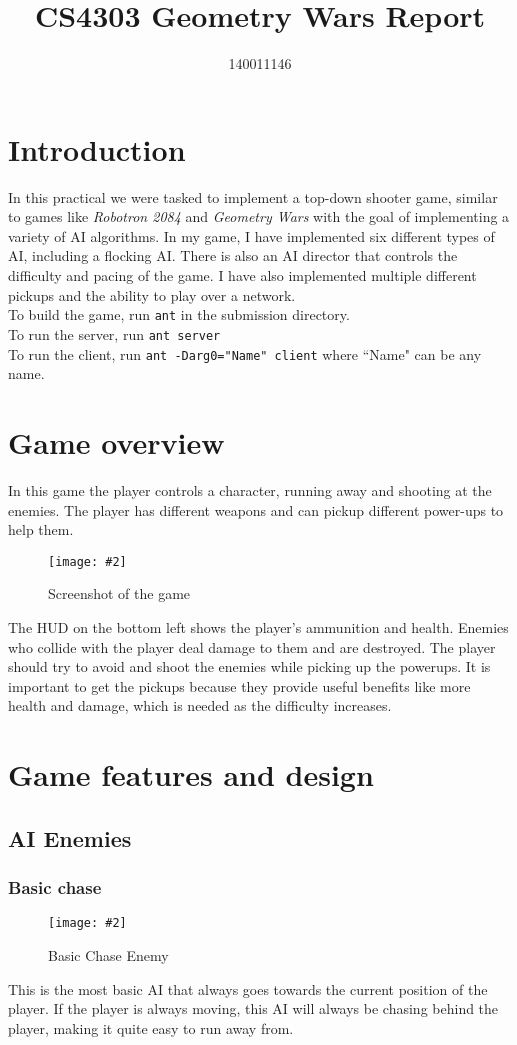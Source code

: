 \documentclass{article}
\title{CS4303 Geometry Wars Report}
\author{140011146}
\newcommand{\n}[0]{\\[\baselineskip]}
\newcommand{\figimg}[3]{
  \begin{figure}[H]
    \centering
    \texttt{[image: \#2]}
    \caption{#3}
  \end{figure}
  \noindent 
}
\begin{document}
\maketitle

\section{Introduction}
In this practical we were tasked to implement a top-down shooter game, similar to games like \textit{Robotron 2084} and \textit{Geometry Wars} with the goal of implementing a variety of AI algorithms. In my game, I have implemented six different types of AI, including a flocking AI. There is also an AI director that controls the difficulty and pacing of the game. I have also implemented multiple different pickups and the ability to play over a network.
\n
To build the game, run \texttt{ant} in the submission directory.
\\
\noindent
To run the server, run \texttt{ant server}
\\
\noindent
To run the client, run \texttt{ant -Darg0="Name" client} where ``Name" can be any name.
\section{Game overview}
In this game the player controls a character, running away and shooting at the enemies. The player has different weapons and can pickup different power-ups to help them.
\figimg{1}{imgs/Screenshot.png}{Screenshot of the game}
The HUD on the bottom left shows the player's ammunition and health. Enemies who collide with the player deal damage to them and are destroyed. The player should try to avoid and shoot the enemies while picking up the powerups. It is important to get the pickups because they provide useful benefits like more health and damage, which is needed as the difficulty increases.
\section{Game features and design}
\subsection{AI Enemies}
\subsubsection{Basic chase}
\figimg{0.1}{imgs/BasicChaseEnemy.png}{Basic Chase Enemy}
This is the most basic AI that always goes towards the current position of the player. If the player is always moving, this AI will always be chasing behind the player, making it quite easy to run away from.
\end{document}
